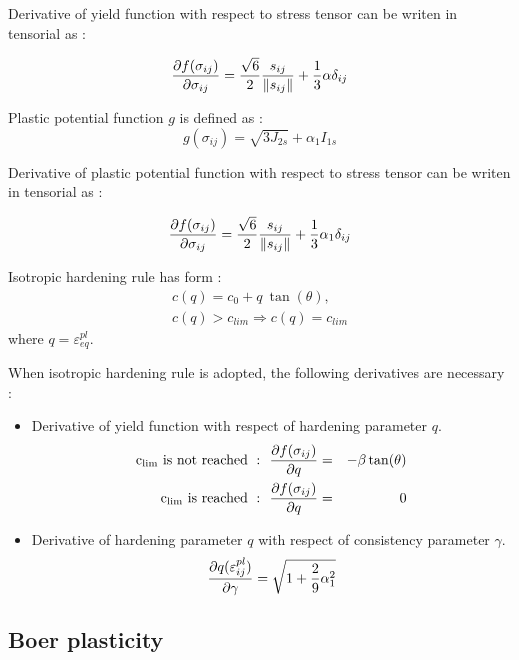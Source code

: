 Derivative of yield function with respect to stress tensor can be writen in tensorial as :

\begin{equation}
\mbox{$\displaystyle\frac{\partial{f(\sigma_{ij})}}{\partial{\sigma_{ij}}}$} = \mbox{$\displaystyle\frac{\sqrt{6}}{2}$}\mbox{$\displaystyle\frac{s_{ij}}{\|s_{ij}\|}$} + \mbox{$\displaystyle\frac{1}{3}$} \alpha \delta_{ij}
\end{equation}

Plastic potential function $g$ is defined as :
\begin{equation}
g(\sigma_{ij}) = \sqrt{3 J_{2s}} + \alpha_1 I_{1s}
\end{equation}


Derivative of plastic potential function with respect to stress tensor can be writen in tensorial as :

\begin{equation}
\mbox{$\displaystyle\frac{\partial{f(\sigma_{ij})}}{\partial{\sigma_{ij}}}$} = \mbox{$\displaystyle\frac{\sqrt{6}}{2}$}\mbox{$\displaystyle\frac{s_{ij}}{\|s_{ij}\|}$} + \mbox{$\displaystyle\frac{1}{3}$} \alpha_1 \delta_{ij}
\end{equation}

Isotropic hardening rule has form :
\begin{eqnarray}
c(q) = c_0 + q\ \tan(\theta), \\
c(q) > c_{lim} \Rightarrow c(q) = c_{lim}
\end{eqnarray}
where $q = \varepsilon_{eq}^{pl}$.

When isotropic hardening rule is adopted, the following derivatives are necessary :
\begin  {itemize}
\item Derivative of yield function with respect of hardening parameter $q$.
\begin{eqnarray}
{\rm c_{lim}\ is\ not\ reached\ :\ \ }
\mbox{$\displaystyle\frac{\partial{f(\sigma_{ij})}}{\partial{q}}$} &=& -\beta \tan(\theta) \\
{\rm c_{lim}\ is\ reached\ :\ \ }
\mbox{$\displaystyle\frac{\partial{f(\sigma_{ij})}}{\partial{q}}$} &=& 0
\end{eqnarray}
\item Derivative of hardening parameter $q$ with respect of consistency parameter $\gamma$.
\begin{equation}
\mbox{$\displaystyle\frac{\partial{q(\varepsilon_{ij}^{pl})}}{\partial{\gamma}}$} = \sqrt{1+\mbox{$\displaystyle\frac{2}{9}$}\alpha_1^2}
\end{equation}
\end {itemize}


\subsection{Boer plasticity}

